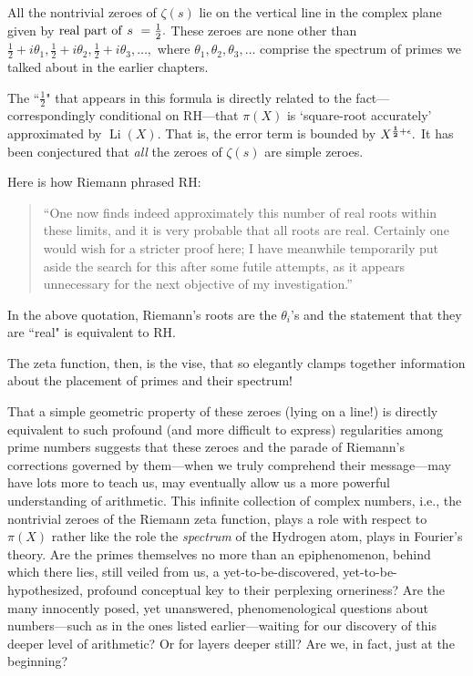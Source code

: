 \documentclass[openany]{book}
\DeclareMathOperator{\Li}{Li}
\theoremstyle{plain}
\theoremstyle{definition}
\begin{document}
{{\begin{center}
{\begin{minipage}{0.9\textwidth}
       All the nontrivial zeroes of $\zeta(s)$ lie on the vertical
       line in the complex plane given by ${\rm real\ part\ of\ } s\ =
       {\frac{1}{2}}.$ These zeroes are none other than
       ${\frac{1}{2}}+i\theta_1,{\frac{1}{2}}+i\theta_2,
       {\frac{1}{2}}+i\theta_3,\dots,$ where $\theta_1, \theta_2,
       \theta_3, \dots$ comprise the spectrum of primes we talked
       about in the earlier chapters.

\vspace{1ex}
\end{minipage}}
      \end{center}

The ``${\frac{1}{2}}$" that appears in this formula is directly related to the fact---correspondingly conditional on RH---that $\pi(X)$ is `square-root accurately' approximated by $\Li(X)$.  That is, the error term is bounded by $X^{{\bf{\frac{1}{2}}}+\epsilon}.$  It has been conjectured that {\it all} the zeroes of $\zeta(s)$ are simple zeroes.


Here is how Riemann phrased RH:

 \begin{quote}
  ``One now finds indeed approximately this number of real roots
  within these limits, and it is very probable that all roots are
  real. Certainly one would wish for a stricter proof here; I have
  meanwhile temporarily put aside the search for this after some
  futile attempts, as it appears unnecessary for the next objective of
  my investigation.''
\end{quote}

 In the above quotation, Riemann's roots are the $\theta_i$'s and the statement that they are ``real" is equivalent to RH.

      The zeta function, then, is the vise, that so elegantly clamps
      together information about the placement of primes and their
      spectrum!


That a simple geometric property of these zeroes (lying on a line!) is
directly equivalent to such profound (and more difficult to express)
regularities among prime numbers suggests that these zeroes and the
parade of Riemann's corrections governed by them---when we truly
comprehend their message---may have lots more to teach us, may
eventually allow us a more powerful understanding of arithmetic.  This
infinite collection of complex numbers, i.e., the nontrivial zeroes of
the Riemann zeta function, plays a role with respect to $\pi(X)$ rather
like the role the {\em spectrum} of the Hydrogen atom, plays in
Fourier's theory.  Are the primes themselves no more than an
epiphenomenon, behind which there lies, still veiled from us, a
yet-to-be-discovered, yet-to-be-hypothesized, profound conceptual key
to their perplexing orneriness?  Are the many innocently posed, yet
unanswered, phenomenological questions about numbers---such as in the
ones listed earlier---waiting for our discovery of this deeper level
of arithmetic?  Or for layers deeper still?  Are we, in fact, just at
the beginning?




}}
\end{document}
